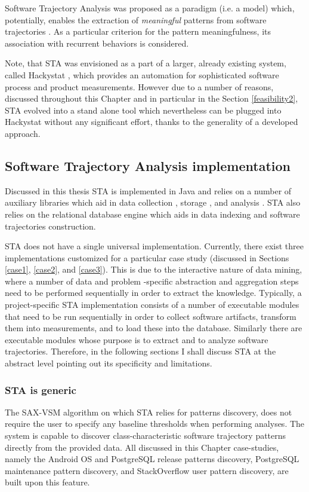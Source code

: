 Software Trajectory Analysis was proposed as a paradigm (i.e. a model) which, potentially, enables the extraction of \textit{meaningful} patterns from software trajectories \cite{citeulike:13159603}. As a particular criterion for the pattern meaningfulness, its association with recurrent behaviors is considered. 

Note, that STA was envisioned as a part of a larger, already existing system, called Hackystat \cite{citeulike:557296}, which provides an automation for sophisticated software process and product measurements. However due to a number of reasons, discussed throughout this Chapter and in particular in the Section \ref{feasibility2}, STA evolved into a stand alone tool which nevertheless can be plugged into Hackystat without any significant effort, thanks to the generality of a developed approach.

\subsection{Software Trajectory Analysis implementation}
Discussed in this thesis STA is implemented in Java and relies on a number of auxiliary libraries which aid in data collection \cite{jgit}, storage \cite{mybatis}, and analysis \cite{sax-vsm}. STA also relies on the relational database engine which aids in data indexing and software trajectories construction. 

STA does not have a single universal implementation. Currently, there exist three implementations customized for a particular case study (discussed in Sections \ref{case1}, \ref{case2}, and \ref{case3}). This is due to the interactive nature of data mining, where a number of data and problem -specific abstraction and aggregation steps need to be performed sequentially in order to extract the knowledge. Typically, a project-specific STA implementation consists of a number of executable modules that need to be run sequentially in order to collect software artifacts, transform them into measurements, and to load these into the database. Similarly there are executable modules whose purpose is to extract and to analyze software trajectories. Therefore, in the following sections I shall discuss STA at the abstract level pointing out its specificity and limitations.

\subsubsection{STA is generic}
The \mbox{SAX-VSM} algorithm on which STA relies for patterns discovery, does not require the user to specify any baseline thresholds when performing analyses. The system is capable to discover class-characteristic software trajectory patterns directly from the provided data. All discussed in this Chapter case-studies, namely the Android OS and PostgreSQL release patterns discovery,  PostgreSQL maintenance pattern discovery, and StackOverflow user pattern discovery, are built upon this feature.

